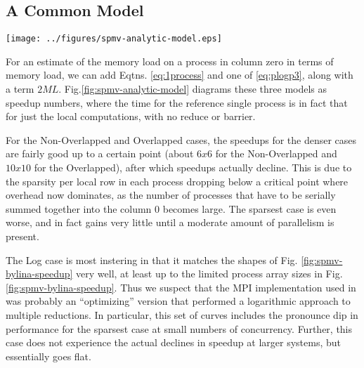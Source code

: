 \subsection{A Common Model}

\begin{figure*}\begin{centering}
\texttt{[image: ../figures/spmv-analytic-model.eps]}
\caption{The Three Models.}
\label{fig:spmv-analytic-model}
\end{centering}\end{figure*}

For an estimate of the memory load on a process in column zero in terms of memory load, we can add Eqtns. \ref{eq:1process} and one of \ref{eq:plogp3}, along with a term $2ML$. Fig.\ref{fig:spmv-analytic-model} diagrams these three models as speedup numbers, where the time for the reference single process is in fact that for just the local computations, with no reduce or barrier.

For the Non-Overlapped and Overlapped cases, the speedups for the denser cases are fairly good up to a certain point (about $6x6$ for the Non-Overlapped and $10x10$ for the Overlapped), after which speedups actually decline. This is due to the sparsity per local row in each process dropping below a critical point where overhead now dominates, as the number of processes that have to be serially summed together into the column 0 becomes large. The sparsest case is even worse, and in fact gains very little until a moderate amount of parallelism is present.

The Log case is most instering in that it matches the shapes of Fig. \ref{fig:spmv-bylina-speedup} very well, at least up to the limited process array sizes in Fig. \ref{fig:spmv-bylina-speedup}.  Thus we suspect that the MPI implementation used in \cite{techbib:6933066} was probably an ``optimizing'' version that performed a logarithmic approach to multiple reductions. In particular, this set of curves includes the pronounce dip in performance for the sparsest case at small numbers of concurrency. Further, this case does not experience the actual declines in speedup at larger systems, but essentially goes flat.

